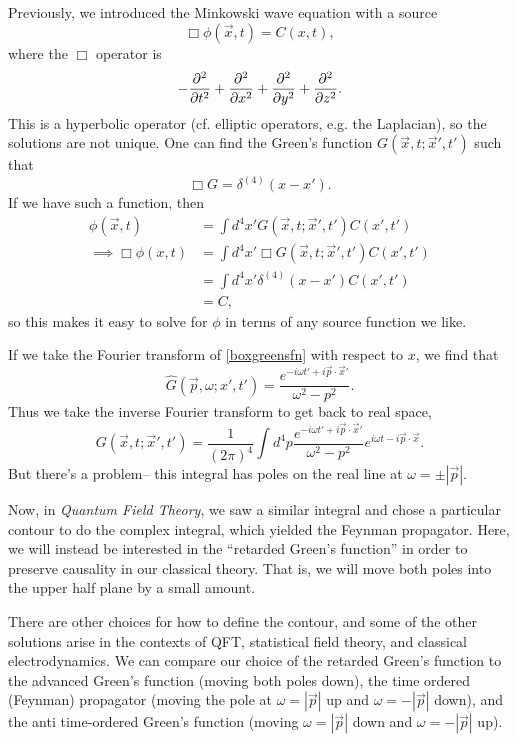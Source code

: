 Previously, we introduced the Minkowski wave equation with a source
$$\Box \phi(\vec x,t)=C(x,t),$$
where the $\Box$ operator is
$$-\frac{\partial^2}{\partial t^2}+\frac{\partial^2}{\partial x^2}+\frac{\partial^2}{\partial y^2}+\frac{\partial^2}{\partial z^2}.$$
This is a hyperbolic operator (cf. elliptic operators, e.g. the Laplacian), so the solutions are not unique. One can find the Green's function $G(\vec x,t;\vec x',t')$ such that
\begin{equation}
\Box G=\delta^{(4)}(x-x').\label{boxgreensfn}
\end{equation}
If we have such a function, then
\begin{align*}
    \phi(\vec x,t)&= \int d^4 x' G(\vec x,t; \vec x',t') C(x',t')\\
    \implies \Box \phi(x,t)&=\int d^4x' \Box G(\vec x,t;\vec x',t')C(x',t')\\
    &=\int d^4x' \delta^{(4)}(x-x')C(x',t')\\
    &=C,
\end{align*}
so this makes it easy to solve for $\phi$ in terms of any source function we like.

If we take the Fourier transform of \ref{boxgreensfn} with respect to $x$, we find that
$$\hat G(\vec p,\omega;x',t')=\frac{e^{-i\omega t'+i\vec p \cdot \vec x'}}{\omega^2-p^2}.$$
Thus we take the inverse Fourier transform to get back to real space,
$$G(\vec x,t; \vec x',t')=\frac{1}{(2\pi)^4} \int d^4p \frac{e^{-i\omega t'+i\vec p \cdot \vec x'}}{\omega^2-p^2}e^{i\omega t-i \vec p \cdot \vec x}.$$
But there's a problem-- this integral has poles on the real line at $\omega=\pm |\vec p|$.

Now, in \emph{Quantum Field Theory}, we saw a similar integral and chose a particular contour to do the complex integral, which yielded the Feynman propagator. Here, we will instead be interested in the ``retarded Green's function'' in order to preserve causality in our classical theory. That is, we will move both poles into the upper half plane by a small amount.

There are other choices for how to define the contour, and some of the other solutions arise in the contexts of QFT, statistical field theory, and classical electrodynamics. We can compare our choice of the retarded Green's function to the advanced Green's function (moving both poles down), the time ordered (Feynman) propagator (moving the pole at $\omega=|\vec p|$ up and $\omega=-|\vec p|$ down), and the anti time-ordered Green's function (moving $\omega=|\vec p|$ down and $\omega=-|\vec p|$ up).

